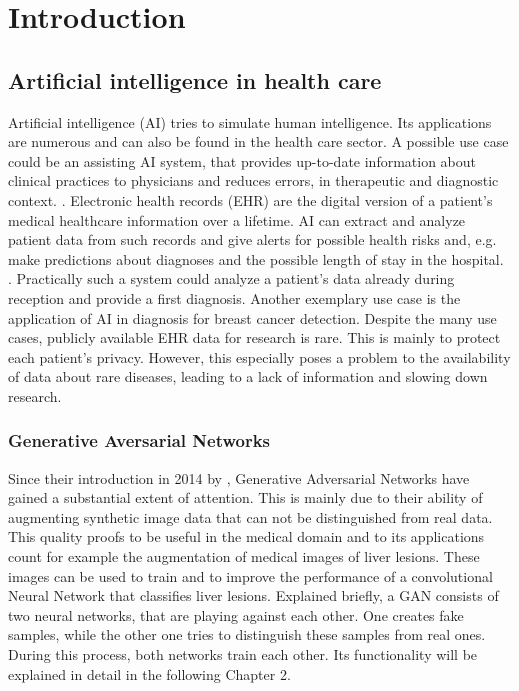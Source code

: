 \documentclass[11pt, a4paper]{book}
\begin{document}





\chapter{Introduction}

\section{Artificial intelligence in health care}
Artificial intelligence (AI) tries to simulate human intelligence. Its applications are numerous and can also be found in the health care sector. A possible use case could be an assisting AI system, that provides up-to-date information about clinical practices to physicians and reduces errors, in therapeutic and diagnostic context. \cite{jiang2017artificial}. Electronic health records (EHR) are the digital version of a patient's medical healthcare information over a lifetime. AI can extract and analyze patient data from such records and give alerts for possible health risks and, e.g. make predictions about diagnoses and the possible length of stay in the hospital. \cite{neill2013using}. Practically such a system could analyze a patient's data already during reception and provide a first diagnosis. Another exemplary use case is the application of AI in diagnosis for breast cancer detection. \cite{ubeyli2007implementing} Despite the many use cases, publicly available EHR data for research is rare. This is mainly to protect each patient's privacy. However, this especially poses a problem to the availability of data about rare diseases, leading to a lack of information and slowing down research. \cite{bremond2015contribution}

\subsection{Generative Aversarial Networks}
Since their introduction in 2014 by \cite{Goodfellow2014}, Generative Adversarial Networks have gained a substantial extent of attention. This is mainly due to their ability of augmenting synthetic image data that can not be distinguished from real data. This quality proofs to be useful in the medical domain and to its applications count for example the augmentation of medical images of liver lesions. These images can be used to train and to improve the performance of a convolutional Neural Network that classifies liver lesions. \cite{frid2018gan} Explained briefly, a GAN consists of two neural networks, that are playing against each other. One creates fake samples, while the other one tries to distinguish these samples from real ones. During this process, both networks train each other. \citep{Goodfellow2014} Its functionality will be explained in detail in the following Chapter 2.
\end{document}
